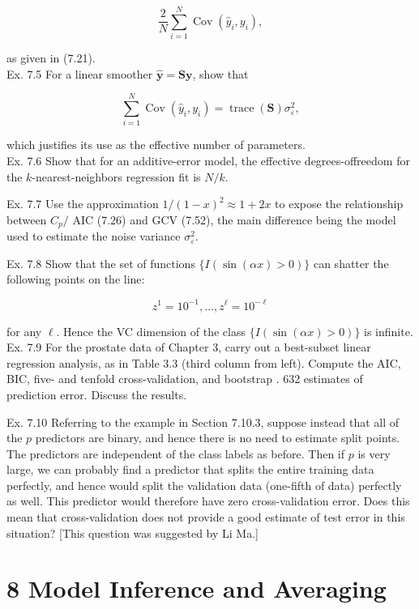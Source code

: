 \documentclass[10pt]{article}
\begin{document}
$$
\frac{2}{N} \sum_{i=1}^{N} \operatorname{Cov}\left(\hat{y}_{i}, y_{i}\right),
$$

as given in (7.21).\\
Ex. 7.5 For a linear smoother $\hat{\mathbf{y}}=\mathbf{S y}$, show that


\begin{equation*}
\sum_{i=1}^{N} \operatorname{Cov}\left(\hat{y}_{i}, y_{i}\right)=\operatorname{trace}(\mathbf{S}) \sigma_{\varepsilon}^{2}, \tag{7.65}
\end{equation*}


which justifies its use as the effective number of parameters.\\
Ex. 7.6 Show that for an additive-error model, the effective degrees-offreedom for the $k$-nearest-neighbors regression fit is $N / k$.

Ex. 7.7 Use the approximation $1 /(1-x)^{2} \approx 1+2 x$ to expose the relationship between $C_{p} /$ AIC (7.26) and GCV (7.52), the main difference being the model used to estimate the noise variance $\sigma_{\varepsilon}^{2}$.

Ex. 7.8 Show that the set of functions $\{I(\sin (\alpha x)>0)\}$ can shatter the following points on the line:


\begin{equation*}
z^{1}=10^{-1}, \ldots, z^{\ell}=10^{-\ell} \tag{7.66}
\end{equation*}


for any $\ell$. Hence the VC dimension of the class $\{I(\sin (\alpha x)>0)\}$ is infinite.\\
Ex. 7.9 For the prostate data of Chapter 3, carry out a best-subset linear regression analysis, as in Table 3.3 (third column from left). Compute the AIC, BIC, five- and tenfold cross-validation, and bootstrap . 632 estimates of prediction error. Discuss the results.

Ex. 7.10 Referring to the example in Section 7.10.3, suppose instead that all of the $p$ predictors are binary, and hence there is no need to estimate split points. The predictors are independent of the class labels as before. Then if $p$ is very large, we can probably find a predictor that splits the entire training data perfectly, and hence would split the validation data (one-fifth of data) perfectly as well. This predictor would therefore have zero cross-validation error. Does this mean that cross-validation does not provide a good estimate of test error in this situation? [This question was suggested by Li Ma.]

\section*{8 Model Inference and Averaging}
\end{document}
